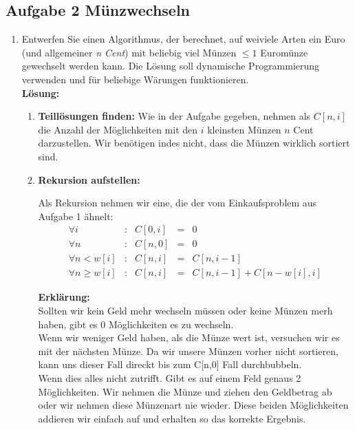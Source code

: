 \documentclass[11pt,a4paper,ngerman]{article}
\begin{document}

\subsection*{Aufgabe 2 \mdseries Münzwechseln}

\begin{enumerate}[\bfseries (a)]



\item Entwerfen Sie einen Algorithmus, der berechnet, auf weiviele Arten ein Euro (und allgemeiner \emph{n Cent}) mit beliebig viel Münzen $\leq 1$ Euromünze gewechselt werden kann. Die Lösung soll dynamische Programmierung verwenden und für beliebige Wärungen funktionieren.\\

\textbf{Lösung:}

\begin{enumerate}

\item{\bfseries Teillösungen finden:} Wie in der Aufgabe gegeben, nehmen als $C[n,i]$ die Anzahl der Möglichkeiten mit den $i$ kleinsten Münzen $n$ Cent darzustellen. Wir benötigen indes nicht, dass die Münzen wirklich sortiert sind.

\pagebreak

\item{\bfseries Rekursion aufstellen:}

Als Rekursion nehmen wir eine, die der vom Einkaufsproblem aus Aufgabe 1 ähnelt:
$$
\begin{array}{lcrcl}
\forall i &:& C[0,i] &=& 0\\
\forall n &:& C[n,0] &=& 0\\
\forall n<w[i] &:& C[n,i] &=& C[n,i-1]\\
\forall n\geq w[i] &:& C[n,i] &=& C[n,i-1] + C[n - w[i] , i]
\end{array}
$$

\textbf{Erklärung:}\\
Sollten wir kein Geld mehr wechseln müssen oder keine Münzen merh haben, gibt es 0 Möglichkeiten es zu wechseln.\\
Wenn wir weniger Geld haben, als die Münze wert ist, versuchen wir es mit der nächsten Münze. Da wir unsere Münzen vorher nicht sortieren, kann uns dieser Fall direckt bis zum C[n,0] Fall durchbubbeln.\\
Wenn dies alles nicht zutrifft. Gibt es auf einem Feld genaus 2 Möglichkeiten. Wir nehmen die Münze und ziehen den Geldbetrag ab oder wir nehmen diese Münzenart nie wieder. Diese beiden Möglichkeiten addieren wir einfach auf und erhalten so das korrekte Ergebnis.\\


\end{enumerate}
\end{enumerate}
\end{document}
